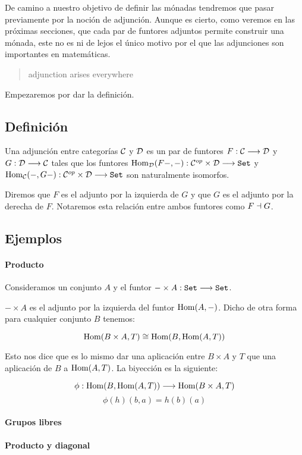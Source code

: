 De camino a nuestro objetivo de definir las mónadas tendremos
que pasar previamente por la noción de adjunción. Aunque
es cierto, como veremos en las próximas secciones, que cada par
de funtores adjuntos permite construir una mónada, este no es
ni de lejos el
único motivo por el que las adjunciones son importantes en matemáticas.

\begin{quotation}
  adjunction arises everywhere
\end{quotation}

Empezaremos por dar la definición.

\subsection{Definición}
\begin{definition}
  Una adjunción entre categorías $\mathcal{C}$ y $\mathcal{D}$ es un par de funtores
  $F : \mathcal{C}\longrightarrow \mathcal{D}$ y $G: \mathcal{D}\longrightarrow \mathcal{C}$ tales que los funtores
  $\operatorname{Hom}_{\mathcal{D}}(F-, -) : \mathcal{C}^{op}\times\mathcal{D}\longrightarrow \texttt{Set}$ y
  $\operatorname{Hom}_{\mathcal{C}}(-, G-) : \mathcal{C}^{op}\times\mathcal{D}\longrightarrow \texttt{Set}$ son naturalmente isomorfos.

  Diremos que $F$ es el
  adjunto por la izquierda de $G$ y que $G$ es el adjunto
  por la derecha de $F$. Notaremos esta relación entre ambos funtores
  como $F \dashv G$.
\end{definition}

\subsection{Ejemplos}
\paragraph{Producto}
Consideramos un conjunto $A$ y el funtor $-\times A : \texttt{Set}\longrightarrow \texttt{Set}$.

$-\times A$ es el adjunto por la izquierda del funtor $\operatorname{Hom}(A, -)$.
Dicho de otra forma para cualquier conjunto $B$ tenemos:

$$\operatorname{Hom}(B\times A, T) \cong \operatorname{Hom}(B, \operatorname{Hom}(A, T))$$

Esto nos dice que es lo mismo dar una aplicación entre
$B\times A$ y $T$ que una aplicación de $B$ a $\operatorname{Hom}(A, T)$. La
biyección es la siguiente:

$$\phi: \operatorname{Hom}(B, \operatorname{Hom}(A, T))\longrightarrow \operatorname{Hom}(B\times A, T)$$
$$\phi(h)(b, a) = h(b)(a)$$

\paragraph{Grupos libres}

\paragraph{Producto y diagonal}
